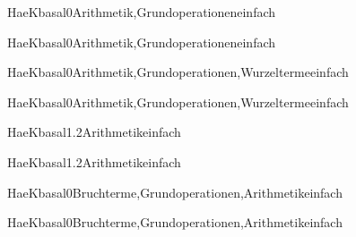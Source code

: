 \documentclass[12pt]{article}
\begin{document}
\begin{Add}{HaeK}{basal0}{Arithmetik,Grundoperationen}{einfach}
\solution{ }
\end{Add}
\begin{Add}{HaeK}{basal0}{Arithmetik,Grundoperationen}{einfach}
\end{Add}

\begin{Add}{HaeK}{basal0}{Arithmetik,Grundoperationen,Wurzelterme}{einfach}
\solution{ }
\end{Add}
\begin{Add}{HaeK}{basal0}{Arithmetik,Grundoperationen,Wurzelterme}{einfach}
\end{Add}

\begin{Add}{HaeK}{basal1.2}{Arithmetik}{einfach}
\solution{ }
\end{Add}
\begin{Add}{HaeK}{basal1.2}{Arithmetik}{einfach}
\end{Add}

            \begin{Add}{HaeK}{basal0}{Bruchterme,Grundoperationen,Arithmetik}{einfach}
            \solution{ }
            \end{Add}
            \begin{Add}{HaeK}{basal0}{Bruchterme,Grundoperationen,Arithmetik}{einfach}
            \end{Add}
            
\end{document}
